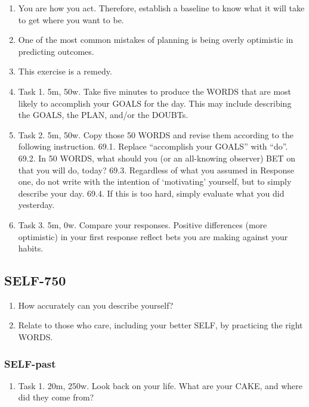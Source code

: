 \documentclass[
]{book}
\providecommand{\tightlist}{%
  \setlength{\itemsep}{0pt}\setlength{\parskip}{0pt}}
\begin{document}
\begin{enumerate}
\def\labelenumi{\arabic{enumi}.}
\setcounter{enumi}{64}
\item
  You are how you act. Therefore, establish a baseline to know what it will take to
  get where you want to be.
\item
  One of the most common mistakes of planning is being overly optimistic in
  predicting outcomes.
\item
  This exercise is a remedy.
\item
  Task 1. 5m, 50w. Take five minutes to produce the WORDS that are most likely
  to accomplish your GOALS for the day. This may include describing the GOALS,
  the PLAN, and/or the DOUBTs.
\item
  Task 2. 5m, 50w. Copy those 50 WORDS and revise them according to the
  following instruction.
  69.1. Replace ``accomplish your GOALS'' with ``do''.
  69.2. In 50 WORDS, what should you (or an all-knowing observer) BET on that
  you will do, today?
  69.3. Regardless of what you assumed in Response one, do not write with the
  intention of `motivating' yourself, but to simply describe your day.
  69.4. If this is too hard, simply evaluate what you did yesterday.
\item
  Task 3. 5m, 0w. Compare your responses. Positive differences (more optimistic)
  in your first response reflect bets you are making against your habits.
\end{enumerate}

\hypertarget{self-750}{%
\subsection{SELF-750}\label{self-750}}

\begin{enumerate}
\def\labelenumi{\arabic{enumi}.}
\setcounter{enumi}{70}
\tightlist
\item
  How accurately can you describe yourself?
\item
  Relate to those who care, including your better SELF, by practicing the right
  WORDS.
\end{enumerate}

\hypertarget{self-past}{%
\subsubsection{SELF-past}\label{self-past}}

\begin{enumerate}
\def\labelenumi{\arabic{enumi}.}
\setcounter{enumi}{72}
\tightlist
\item
  Task 1. 20m, 250w. Look back on your life. What are your CAKE, and where did
  they come from?
\end{enumerate}
\end{document}
